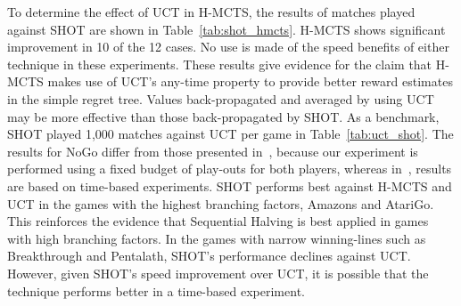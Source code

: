 \documentclass[a4paper]{llncs}
\begin{document}
To determine the effect of UCT in H-MCTS, the results of matches played against SHOT are shown in Table~\ref{tab:shot_hmcts}. H-MCTS shows significant improvement in 10 of the 12 cases. No use is made of the speed benefits of either technique in these experiments. These results give evidence for the claim that H-MCTS makes use of UCT's any-time property to provide better reward estimates in the simple regret tree. Values back-propagated and averaged by using UCT may be more effective than those back-propagated by SHOT.
As a benchmark, SHOT played 1,000 matches against UCT per game in Table~\ref{tab:uct_shot}. The results for NoGo differ from those presented in~\cite{Cazenave14SHOT}, because our experiment is performed using a fixed budget of play-outs for both players, whereas in~\cite{Cazenave14SHOT}, results are based on time-based experiments. SHOT performs best against H-MCTS and UCT in the games with the highest branching factors, Amazons and AtariGo. This reinforces the evidence that Sequential Halving is best applied in games with high branching factors. In the games with narrow winning-lines such as Breakthrough and Pentalath, SHOT's performance declines against UCT. However, given SHOT's speed improvement over UCT, it is possible that the technique performs better in a time-based experiment.
\end{document}
